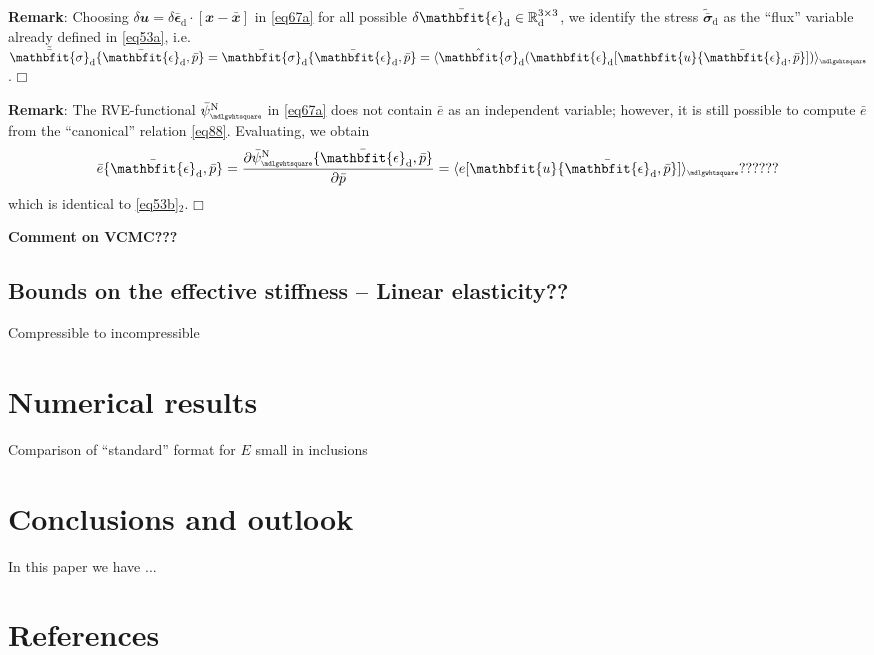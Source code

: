 \documentclass[12pt,a4paper]{article}
\renewcommand{\ta}[1]{\mathbfit{#1}}
\renewcommand{\ts}[1]{\mathbfit{#1}}
\renewcommand{\Box}{\mdlgwhtsquare}
\DeclarePairedDelimiter{\homgen}{\langle}{\rangle_\rve}
\renewcommand{\dev}{\mathrm{d}}
\newcommand{\rve}{
  {\mathchoice
   {\mbox{\scalebox{0.67}{$\Box$}}}
   {\mbox{\scalebox{0.67}{$\Box$}}}
   {\mbox{\scalebox{0.5}{$\Box$}}}
   {\mbox{\scalebox{0.375}{$\Box$}}}
  }
}
\begin{document}
\textbf{Remark}: Choosing $\delta\ta{u}=\delta\bar{\ts\epsilon}_\dev\cdot[\ta{x}-\bar{\ta{x}}]$ in \cref{eq67a} for all possible $\delta\bar{\ts\epsilon}_\dev\in\set{R}^{3\times 3}_\dev$, we identify the stress $\tilde{\bar{\ts\sigma}}_\dev$ as the ``flux'' variable already defined in \cref{eq53a}, i.e. $\tilde{\bar{\ts\sigma}}_\dev\{\bar{\ts\epsilon}_\dev,\bar{p}\}=\bar{\ts\sigma}_\dev\{\bar{\ts\epsilon}_\dev,\bar{p}\}=
\homgen{ \hat{\ts{\sigma}}_\dev(\ts{\epsilon}_\dev[\ta{u}\{\bar{\ts\epsilon}_\dev,\bar{p}\}]) }$. $\Box$
 
\textbf{Remark}: The RVE-functional $\bar{\psi}_\rve^\Neumann$ in \cref{eq67a} does not contain $\bar{e}$ as an independent variable; however, it is still possible to compute $\bar{e}$ from the ``canonical'' relation \cref{eq88}.
Evaluating, we obtain
\begin{equation}
     \bar{e}\{\bar{\ts\epsilon}_\dev,\bar{p}\} = \frac{\partial \bar{\psi}_\rve^\Neumann\{\bar{\ts\epsilon}_\dev,\bar{p}\}}{\partial \bar{p}} = 
     \homgen{ e[\ta{u}\{\bar{\ts\epsilon}_\dev,\bar{p}\}] } ??????
\label{eq188}
\end{equation}
which is identical to \cref{eq53b}$_2$. $\Box$

\textbf{Comment on VCMC???}





\subsection{Bounds on the effective stiffness -- Linear elasticity??}

Compressible to incompressible


\section{Numerical results}

Comparison of ``standard'' format for $E$ small in inclusions


\section{Conclusions and outlook}
In this paper we have ...
\section{References}
\end{document}

